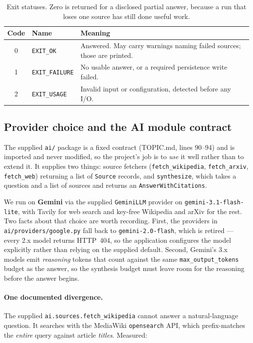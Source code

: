 \documentclass[10pt,a4paper]{article}
\begin{document}
\begin{table}[htbp]
\centering
\footnotesize
\caption{Exit statuses. Zero is returned for a disclosed partial answer, because a run that loses
one source has still done useful work.}
\label{tab:exitcodes}
\begin{tabularx}{\textwidth}{@{}clX@{}}
\toprule
\textbf{Code} & \textbf{Name} & \textbf{Meaning} \\
\midrule
0 & \texttt{EXIT\_OK} & Answered. May carry warnings naming failed sources; those are printed. \\
1 & \texttt{EXIT\_FAILURE} & No usable answer, or a required persistence write failed. \\
2 & \texttt{EXIT\_USAGE} & Invalid input or configuration, detected before any I/O. \\
\bottomrule
\end{tabularx}
\end{table}

\subsection{Provider choice and the AI module contract}

The supplied \texttt{ai/} package is a fixed contract (TOPIC.md, lines 90--94) and is imported
and never modified, so the project's job is to \emph{use} it well rather than to extend it. It
supplies two things: source fetchers (\texttt{fetch\_wikipedia}, \texttt{fetch\_arxiv},
\texttt{fetch\_web}) returning a list of \texttt{Source} records, and \texttt{synthesize}, which
takes a question and a list of sources and returns an \texttt{AnswerWithCitations}.

We run on \textbf{Gemini} via the supplied \texttt{GeminiLLM} provider on
\texttt{gemini-3.1-flash-lite}, with Tavily for web search and key-free Wikipedia and arXiv for the
rest. Two facts about that choice are worth recording. First, the providers in
\texttt{ai/providers/google.py} fall back to \texttt{gemini-2.0-flash}, which is retired --- every
2.x model returns HTTP~404, so the application configures the model explicitly rather than relying
on the supplied default. Second, Gemini's 3.x models emit \emph{reasoning} tokens that count
against the same \texttt{max\_output\_tokens} budget as the answer, so the synthesis budget must
leave room for the reasoning before the answer begins.

\paragraph{One documented divergence.} The supplied \texttt{ai.sources.fetch\_wikipedia} cannot
answer a natural-language question. It searches with the MediaWiki \texttt{opensearch} API, which
prefix-matches the \emph{entire} query against article \emph{titles}. Measured:
\end{document}
